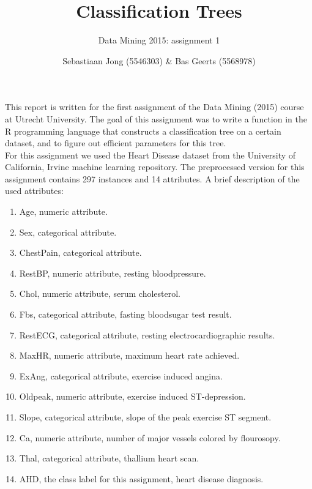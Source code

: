 \documentclass[a4paper,12pt]{scrartcl}
\def\labelitemi{--}
\begin{document}
\title{Classification Trees}
\subtitle{Data Mining 2015: assignment 1}
\author{Sebastiaan Jong (5546303) \& Bas Geerts (5568978)}
\date{}
\maketitle
\noindent
This report is written for the first assignment of the Data Mining (2015) course at Utrecht University. The goal of this assignment was to write a function in the R programming language that constructs a classification tree on a certain dataset, and to figure out efficient parameters for this tree.
\\
For this assignment we used the Heart Disease dataset from the University of California, Irvine machine learning repository. The preprocessed version for this assignment contains 297 instances and 14 attributes. A brief description of the used attributes:
\begin{enumerate} \itemsep0pt
	\renewcommand\labelitemi{--}
	\item Age, numeric attribute.
	\item Sex, categorical attribute.
	\item ChestPain, categorical attribute.
	\item RestBP, numeric attribute, resting bloodpressure.
	\item Chol, numeric attribute, serum cholesterol.
	\item Fbs, categorical attribute, fasting bloodsugar test result. 
	\item RestECG, categorical attribute, resting electrocardiographic results.
	\item MaxHR, numeric attribute, maximum heart rate achieved.
	\item ExAng, categorical attribute, exercise induced angina. 
	\item Oldpeak, numeric attribute, exercise induced ST-depression. 
	\item Slope, categorical attribute, slope of the peak exercise ST segment.
	\item Ca, numeric attribute, number of major vessels colored by flourosopy.
	\item Thal, categorical attribute, thallium heart scan.
	\item AHD, the class label for this assignment, heart disease diagnosis. 
\end{enumerate}
\clearpage
\end{document}
